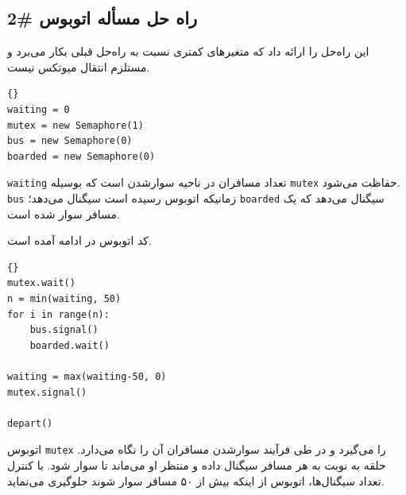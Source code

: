 \documentclass{book}
\begin{document}
\subsection {راه حل مسأله اتوبوس \#2}

    
    این راه‌حل را  ارائه داد که متغیرهای کمتری نسبت به راه‌حل قبلی بکار می‌برد و  مستلزم انتقال میوتکس نیست. 

\begin{latin}
\begin{lstlisting}[title=\rl{راه حل \#2 مسأله اتوبوس  (مقداردهی اولیه)}]{}
waiting = 0
mutex = new Semaphore(1)
bus = new Semaphore(0)
boarded = new Semaphore(0)
\end{lstlisting}
\end{latin}

    {\tt waiting} 
    تعداد مسافران در ناحیه سوارشدن است که بوسیله {\tt mutex} حفاظت می‌شود.  {\tt bus} زمانیکه اتوبوس رسیده است سیگنال می‌دهد؛     {\tt boarded} 
    سیگنال می‌دهد که یک مسافر سوار شده است. 

    کد اتوبوس در ادامه آمده است. 

\begin{latin}
\begin{lstlisting}[title=\rl{راه حل اتوبوس (اتوبوس)}]{}
mutex.wait()
n = min(waiting, 50)
for i in range(n):
    bus.signal()
    boarded.wait()

waiting = max(waiting-50, 0)
mutex.signal()

depart()
\end{lstlisting}
\end{latin}

    اتوبوس {\tt mutex}  را می‌گیرد و در طی فرآیند سوارشدن مسافران آن را نگاه می‌دارد. 
    حلقه به نوبت به هر مسافر  سیگنال داده  و منتظر او می‌ماند تا سوار شود. 
    با کنترل تعداد سیگنال‌ها، اتوبوس از اینکه بیش از ۵۰ مسافر سوار شوند جلوگیری می‌نماید. 
\end{document}
